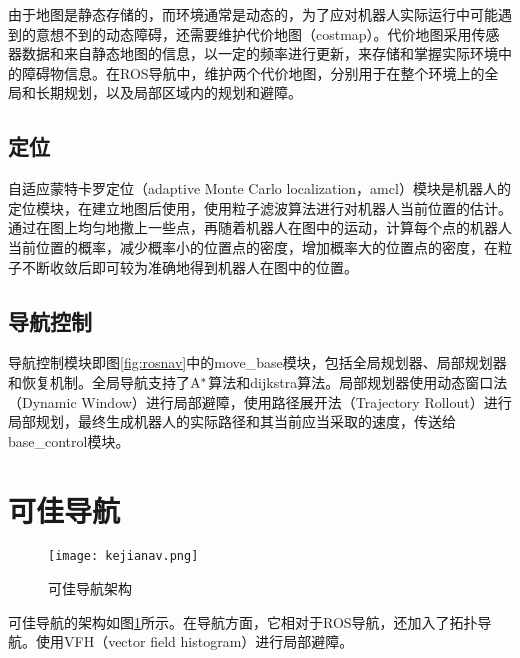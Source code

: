   由于地图是静态存储的，而环境通常是动态的，为了应对机器人实际运行中可能遇到的意想不到的动态障碍，还需要维护代价地图（costmap）。代价地图采用传感器数据和来自静态地图的信息，以一定的频率进行更新，来存储和掌握实际环境中的障碍物信息。在ROS导航中，维护两个代价地图，分别用于在整个环境上的全局和长期规划，以及局部区域内的规划和避障。

\subsection{定位}
  自适应蒙特卡罗定位（adaptive Monte Carlo localization，amcl）模块是机器人的定位模块，在建立地图后使用，使用粒子滤波算法进行对机器人当前位置的估计。通过在图上均匀地撒上一些点，再随着机器人在图中的运动，计算每个点的机器人当前位置的概率，减少概率小的位置点的密度，增加概率大的位置点的密度，在粒子不断收敛后即可较为准确地得到机器人在图中的位置。

\subsection{导航控制}

  导航控制模块即图\ref{fig:rosnav}中的move\_base模块，包括全局规划器、局部规划器和恢复机制。全局导航支持了${\rm A}^\ast$算法和dijkstra算法。局部规划器使用动态窗口法（Dynamic Window）\cite{fox1997dynamic}进行局部避障，使用路径展开法（Trajectory Rollout）\cite{gerkey2008planning}进行局部规划，最终生成机器人的实际路径和其当前应当采取的速度，传送给base\_control模块。

\section{可佳导航}

\begin{figure}[htb]
  \centering
  \texttt{[image: kejianav.png]}
  \caption{可佳导航架构}
  \label{fig:kejianav}
\end{figure}

  可佳导航的架构如图\ref{fig:kejianav}所示。在导航方面，它相对于ROS导航，还加入了拓扑导航。使用VFH（vector field histogram）\cite{borenstein1991vector}进行局部避障。